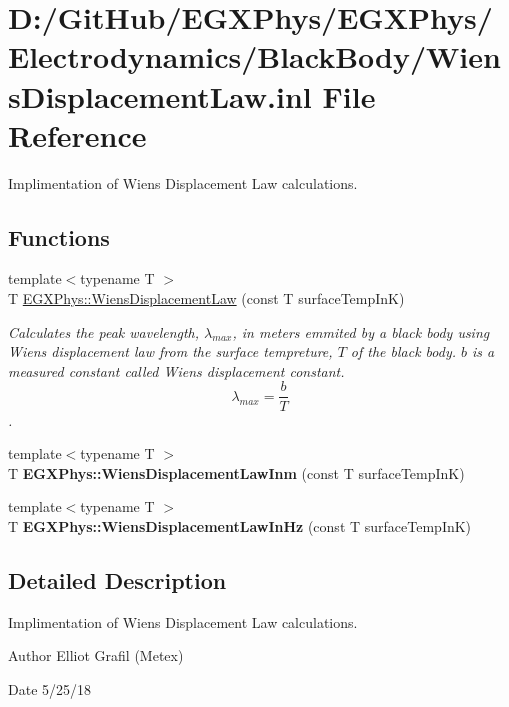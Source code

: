 \hypertarget{_wiens_displacement_law_8inl}{}\section{D\+:/\+Git\+Hub/\+E\+G\+X\+Phys/\+E\+G\+X\+Phys/\+Electrodynamics/\+Black\+Body/\+Wiens\+Displacement\+Law.inl File Reference}
\label{_wiens_displacement_law_8inl}


Implimentation of Wien\textquotesingle{}s Displacement Law calculations.  


\subsection*{Functions}
\begin{DoxyCompactItemize}
\item 
{\footnotesize template$<$typename T $>$ }\\T \mbox{\hyperlink{group___e_g_x_phys-_electrodynamics-_black_body-_wiens_displacement_law_ga8f89ce1baac45a1717f604255d04af44}{E\+G\+X\+Phys\+::\+Wiens\+Displacement\+Law}} (const T surface\+Temp\+InK)
\begin{DoxyCompactList}\small\item\em Calculates the peak wavelength, $\lambda_{max}$, in meters emmited by a black body using Wien\textquotesingle{}s displacement law from the surface tempreture, $T$ of the black body. $b$ is a measured constant called Wien\textquotesingle{}s displacement constant. \[\lambda_{max} = \dfrac{b}{T} \]. \end{DoxyCompactList}\item 
{\footnotesize template$<$typename T $>$ }\\T {\bfseries E\+G\+X\+Phys\+::\+Wiens\+Displacement\+Law\+Inm} (const T surface\+Temp\+InK)
\item 
{\footnotesize template$<$typename T $>$ }\\T {\bfseries E\+G\+X\+Phys\+::\+Wiens\+Displacement\+Law\+In\+Hz} (const T surface\+Temp\+InK)
\end{DoxyCompactItemize}


\subsection{Detailed Description}
Implimentation of Wien\textquotesingle{}s Displacement Law calculations. 

\begin{DoxyAuthor}{Author}
Elliot Grafil (Metex) 
\end{DoxyAuthor}
\begin{DoxyDate}{Date}
5/25/18 
\end{DoxyDate}
